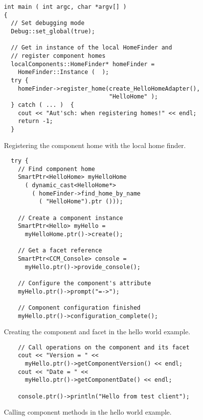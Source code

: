 \begin{Example}
\begin{minifbox}
\begin{small}
\begin{verbatim}
int main ( int argc, char *argv[] )
{
  // Set debugging mode
  Debug::set_global(true);

  // Get in instance of the local HomeFinder and
  // register component homes
  localComponents::HomeFinder* homeFinder =
    HomeFinder::Instance (  );
  try {
    homeFinder->register_home(create_HelloHomeAdapter(),
                              "HelloHome" );
  } catch ( ... )  {
    cout << "Aut'sch: when registering homes!" << endl;
    return -1;
  }
\end{verbatim}
\end{small}
\end{minifbox}
\caption{Registering the component home with the local home finder.}
\label{example:one-component-test-register}
\end{Example}

\begin{Example}
\begin{minifbox}
\begin{small}
\begin{verbatim}
  try {
    // Find component home
    SmartPtr<HelloHome> myHelloHome
      ( dynamic_cast<HelloHome*>
        ( homeFinder->find_home_by_name
          ( "HelloHome").ptr ()));

    // Create a component instance
    SmartPtr<Hello> myHello =
      myHelloHome.ptr()->create();

    // Get a facet reference
    SmartPtr<CCM_Console> console =
      myHello.ptr()->provide_console();

    // Configure the component's attribute
    myHello.ptr()->prompt("=->");

    // Component configuration finished
    myHello.ptr()->configuration_complete();
\end{verbatim}
\end{small}
\end{minifbox}
\caption{Creating the component and facet in the hello world example.}
\label{example:one-component-test-create}
\end{Example}

\begin{Example}
\begin{minifbox}
\begin{small}
\begin{verbatim}
    // Call operations on the component and its facet
    cout << "Version = " <<
      myHello.ptr()->getComponentVersion() << endl;
    cout << "Date = " <<
      myHello.ptr()->getComponentDate() << endl;

    console.ptr()->println("Hello from test client");
\end{verbatim}
\end{small}
\end{minifbox}
\caption{Calling component methods in the hello world example.}
\label{example:one-component-test-call}
\end{Example}

